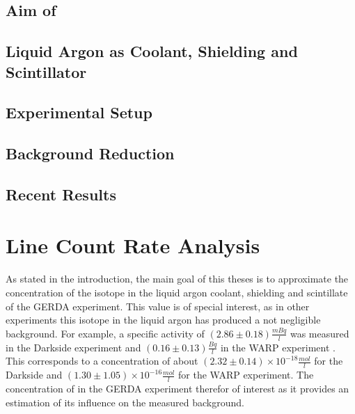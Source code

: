
\section{Aim of \GERDA}
\label{sec:AimGERDA}



\section{Liquid Argon as Coolant, Shielding and Scintillator} 
\label{sec:LArcoolant}


\section{Experimental Setup}
\label{sec:ExSetup}


\section{Background Reduction}
\label{sec:BGReduction}



\section{Recent Results}
\label{sec:ResultsofGERDA}


 
\chapter{Line Count Rate Analysis}
\label{sec:SAfrom514}


As stated in the introduction, the main goal of this theses is to approximate the concentration of the isotope \Kr in the liquid argon coolant, shielding and scintillate of the GERDA experiment. 
This value is of special interest, as in other experiments this isotope in the liquid argon has produced a not negligible background. 
For example, a specific activity of  \((2.86\pm0.18) \frac{\unit{mBq}}{\unit{l}}\) was measured in the Darkside experiment \cite{PhysRevD.93.081101} and \((0.16\pm0.13)\frac{\unit{Bq}}{\unit{l}}\) in the WARP experiment \cite{Benetti:2006az}.
This corresponds to a concentration of about \((2.32\pm0.14)\times10^{-18}\frac{\unit{mol}}{\unit{l}}\) for the Darkside and  \((1.30\pm1.05)\times10^{-16}\frac{\unit{mol}}{\unit{l}}\) for the WARP experiment.
The concentration of \Kr in the GERDA experiment therefor of interest as it provides an estimation of its influence on the measured background.
\\


